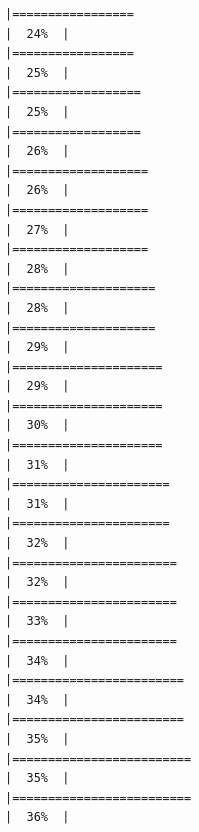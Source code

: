 \documentclass[
  bookmarksnumbered]{article}
\begin{document}
\begin{verbatim}
|=================                                                     |  24%  |                                                                              |=================                                                     |  25%  |                                                                              |==================                                                    |  25%  |                                                                              |==================                                                    |  26%  |                                                                              |===================                                                   |  26%  |                                                                              |===================                                                   |  27%  |                                                                              |===================                                                   |  28%  |                                                                              |====================                                                  |  28%  |                                                                              |====================                                                  |  29%  |                                                                              |=====================                                                 |  29%  |                                                                              |=====================                                                 |  30%  |                                                                              |=====================                                                 |  31%  |                                                                              |======================                                                |  31%  |                                                                              |======================                                                |  32%  |                                                                              |=======================                                               |  32%  |                                                                              |=======================                                               |  33%  |                                                                              |=======================                                               |  34%  |                                                                              |========================                                              |  34%  |                                                                              |========================                                              |  35%  |                                                                              |=========================                                             |  35%  |                                                                              |=========================                                             |  36%  |                                                                              
\end{verbatim}
\end{document}
